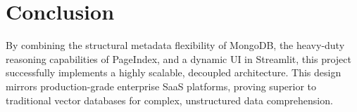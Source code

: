 \documentclass[12pt,a4paper]{article}
\begin{document}
\section{Conclusion}
By combining the structural metadata flexibility of MongoDB, the heavy-duty reasoning capabilities of PageIndex, and a dynamic UI in Streamlit, this project successfully implements a highly scalable, decoupled architecture. This design mirrors production-grade enterprise SaaS platforms, proving superior to traditional vector databases for complex, unstructured data comprehension.
\end{document}
